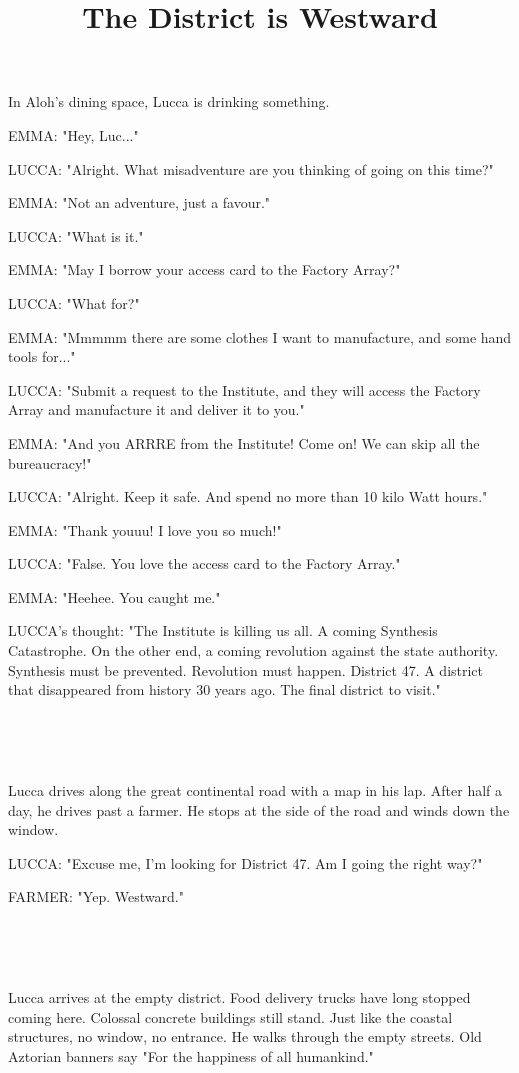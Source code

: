 \documentclass[11pt]{article}
\begin{document}
\ttfamily
\title{The District is Westward}
\maketitle

In Aloh's dining space, Lucca is drinking something.

EMMA: "Hey, Luc..."

LUCCA: "Alright. 
What misadventure are you thinking of going on this time?"

EMMA: "Not an adventure, just a favour."

LUCCA: "What is it."

EMMA: "May I borrow your access card to the Factory Array?"

LUCCA: "What for?"

EMMA: "Mmmmm there are some clothes I want to manufacture, and some hand tools for..."

LUCCA: "Submit a request to the Institute, and they will access the Factory Array and manufacture it and deliver it to you."

EMMA: "And you ARRRE from the Institute!
Come on!
We can skip all the bureaucracy!"

LUCCA: "Alright. 
Keep it safe. 
And spend no more than 10 kilo Watt hours."

EMMA: "Thank youuu! I love you so much!"

LUCCA: "False. You love the access card to the Factory Array."

EMMA: "Heehee. You caught me."

LUCCA's thought: "The Institute is killing us all.
A coming Synthesis Catastrophe.
On the other end, a coming revolution against the state authority.
Synthesis must be prevented.
Revolution must happen.
District 47. 
A district that disappeared from history 30 years ago.
The final district to visit."

\ 

\ 

Lucca drives along the great continental road with a map in his lap.
After half a day, he drives past a farmer.
He stops at the side of the road and winds down the window.

LUCCA: "Excuse me, I'm looking for District 47. 
Am I going the right way?"

FARMER: "Yep. Westward."

\ 

\ 

Lucca arrives at the empty district.
Food delivery trucks have long stopped coming here.
Colossal concrete buildings still stand.
Just like the coastal structures, no window, no entrance.
He walks through the empty streets. 
Old Aztorian banners say "For the happiness of all humankind."
\end{document}
